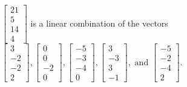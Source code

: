 \begin{exercise}
\begin{exerciseStatement}
  \end{exerciseStatement}
  \begin{exerciseAnswer}
   \(\left[\begin{array}{c}
21 \\
5 \\
14 \\
4
\end{array}\right]\) 
  	 is  
	a linear combination of the vectors \(\left[\begin{array}{c}
3 \\
-2 \\
-2 \\
2
\end{array}\right] , \left[\begin{array}{c}
0 \\
0 \\
-2 \\
0
\end{array}\right] , \left[\begin{array}{c}
-5 \\
-3 \\
-4 \\
0
\end{array}\right] , \left[\begin{array}{c}
3 \\
-3 \\
3 \\
-1
\end{array}\right] , \text{ and } \left[\begin{array}{c}
-5 \\
-2 \\
-4 \\
2
\end{array}\right]\).

	
  


  \end{exerciseAnswer}
\end{exercise}